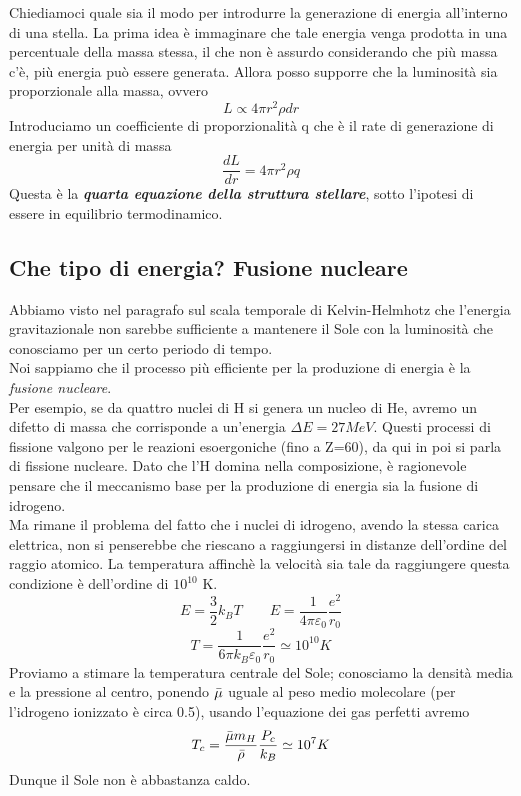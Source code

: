 \documentclass[a4paper,11pt]{article}
\begin{document}
Chiediamoci quale sia il modo per introdurre la generazione di energia all'interno di una stella. La prima idea è immaginare che tale energia venga prodotta in una percentuale della massa stessa, il che non è assurdo considerando che più massa c'è, più energia può essere generata. Allora posso supporre che la luminosità sia proporzionale alla massa, ovvero
$$L\propto 4\pi r^2\rho dr$$
Introduciamo un coefficiente di proporzionalità q che è il rate di generazione di energia per unità di massa
\begin{equation}
   \frac{dL}{dr}=4\pi r^2\rho q
    \label{struttura4} 
\end{equation}
Questa è la \textit{\textbf{quarta equazione della struttura stellare}}, sotto l'ipotesi di essere in equilibrio termodinamico.
\subsection{Che tipo di energia? Fusione nucleare}
Abbiamo visto nel paragrafo sul scala temporale di Kelvin-Helmhotz che l'energia gravitazionale non sarebbe sufficiente a mantenere il Sole con la luminosità che conosciamo per un certo periodo di tempo.\\
Noi sappiamo che il processo più efficiente per la produzione di energia è la \textit{fusione nucleare}.\\
Per esempio, se da quattro nuclei di H si genera un nucleo di He, avremo un difetto di massa che corrisponde a un'energia $\Delta E=27MeV$. Questi processi di fissione valgono per le reazioni esoergoniche (fino a Z=60), da qui in poi si parla di fissione nucleare. Dato che l'H domina nella composizione, è ragionevole pensare che il meccanismo base per la produzione di energia sia la fusione di idrogeno.\\
Ma rimane il problema del fatto che i nuclei di idrogeno, avendo la stessa carica elettrica, non si penserebbe che riescano a raggiungersi in distanze dell'ordine del raggio atomico. La temperatura affinchè la velocità sia tale da raggiungere questa condizione è dell'ordine di $10^{10}$ K.
$$E=\frac{3}{2}k_B T \qquad E=\frac{1}{4\pi \varepsilon_0}\frac{e^2}{r_0}$$
$$T=\frac{1}{6\pi k_B \varepsilon_0}\frac{e^2}{r_0}\simeq 10^{10} K$$
Proviamo a stimare la temperatura centrale del Sole; conosciamo la densità media e la pressione al centro, ponendo $\Bar{\mu}$ uguale al peso medio molecolare (per l'idrogeno ionizzato è circa 0.5), usando l'equazione dei gas perfetti avremo
$$T_c=\frac{\Bar{\mu}m_H}{\Bar{\rho}}\frac{P_c}{k_B}\simeq 10^7 K$$
Dunque il Sole non è abbastanza caldo.\\
\end{document}
